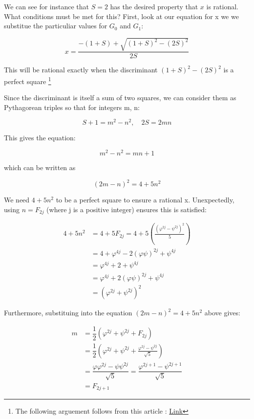 \documentclass[12pt]{article}
\begin{document}
We can see for instance that $S = 2$ has the desired property that $x$ is rational. What conditions must be met for this? First, look at our equation for x we we substitue the particuliar values for $G_0$ and $G_1$:

$$
x = \dfrac{-(1 + S) + \sqrt{(1 + S)^2 - (2S)^2}}{2S}
$$

This will be rational exactly when the discriminant $(1 + S)^2 - (2S)^2$ is a perfect square \footnote{The following arguement follows from this article : \href{https://github.com/chenson2018/Project-Euler-Solutions/blob/master/Haskell\%20Solutions/137_and_140/Reference.pdf/}{Link}} 

\newpage

Since the discriminant is itself a sum of two squares, we can consider them as Pythagorean triples so that for integers m, n:

$$
S + 1 = m^2 - n^2,\quad 2S = 2mn
$$

This gives the equation:

$$
m^2 - n^2 = mn + 1
$$

which can be written as

$$
(2m-n)^2 = 4 + 5n^2
$$

We need $4 + 5n^2$ to be a perfect square to ensure a rational x. Unexpectedly, using $n = F_{2j}$ (where j is a positive integer) ensures this is satisfied:

\begin{align*}
4 + 5n^2 &= 4 + 5F_{2j} = 4 + 5 \left( \frac{(\varphi^{2j}-\psi^{2j})^2}{5} \right)\\
                &= 4 + \varphi^{4j} - 2(\varphi\psi)^{2j} + \psi^{4j}\\
                &= \varphi^{4j} + 2 + \psi^{4j}\\
	     &=   \varphi^{4j} + 2 (\varphi\psi)^{2j}+ \psi^{4j}\\
	     &= (\varphi^{2j} + \psi^{2j})^2
\end{align*}



Furthermore, substituing into the equation $(2m-n)^2 = 4 + 5n^2$  above gives:

\begin{align*}
m &= \dfrac{1}{2} (\varphi^{2j} + \psi^{2j} + F_{2j})\\
    &= \dfrac{1}{2} \left( \varphi^{2j} + \psi^{2j} + \frac{\varphi^{2j}-\psi^{2j}}{\sqrt{5}} \right)\\
    &= \dfrac{\varphi\varphi^{2j} - \psi\psi^{2j}}{\sqrt5} = \dfrac{\varphi^{2j+1} - \psi^{2j+1}}{\sqrt5}\\
    &= F_{2j+1}
\end{align*}
\end{document}
